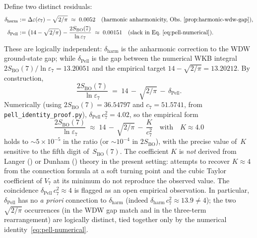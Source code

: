 \begin{observation}
\label{cor:pell-three-term}
Define two distinct residuals:
\begin{align*}
  \delta_{\mathrm{harm}} &:= \Delta\varepsilon(c_7) - \sqrt{2/\pi}
  \;\approx\; 0.0052 \quad\text{(harmonic anharmonicity,
    Obs.~\ref{prop:harmonic-wdw-gap})},\\
  \delta_{\mathrm{Pell}} &:= \bigl(14 - \sqrt{2/\pi}\bigr)
    - \frac{2S_{\mathrm{BO}}(7)}{\ln\varepsilon_7}
  \;\approx\; 0.00151 \quad\text{(slack in Eq.~\eqref{eq:pell-numerical})}.
\end{align*}
These are logically independent: $\delta_{\mathrm{harm}}$ is the
anharmonic correction to the WDW ground-state gap; while
$\delta_{\mathrm{Pell}}$ is the gap between the numerical WKB
integral $2S_{\mathrm{BO}}(7)/\ln\varepsilon_7 = 13.20051$ and the
empirical target $14 - \sqrt{2/\pi} = 13.20212$.
By construction,
\begin{equation}\label{eq:pell-three-term}
  \frac{2S_{\mathrm{BO}}(7)}{\ln\varepsilon_7}
  \;=\; 14 \,-\, \sqrt{2/\pi} \,-\, \delta_{\mathrm{Pell}}.
\end{equation}
Numerically (using $2S_{\mathrm{BO}}(7) = 36.54797$ and
$c_7 = 51.5741$, from \texttt{pell\_identity\_proof.py}),
$\delta_{\mathrm{Pell}}\,c_7^2 = 4.02$, so the empirical form
\begin{equation}\label{eq:pell-empirical}
  \frac{2S_{\mathrm{BO}}(7)}{\ln\varepsilon_7}
  \;\approx\; 14 \,-\, \sqrt{2/\pi} \,-\, \frac{K}{c_7^2}
  \quad\text{with}\quad K \approx 4.0
\end{equation}
holds to $\sim 5 \times 10^{-5}$ in the ratio (or $\sim 10^{-4}$
in $2S_{\mathrm{BO}}$), with the precise value of~$K$ sensitive
to the fifth digit of~$S_{\mathrm{BO}}(7)$.
The coefficient $K$ is \emph{not} derived from Langer
(\citealt{Langer1937}) or Dunham (\citealt{Dunham1932})
theory in the present setting: attempts to recover
$K \approx 4$ from the connection formula at a soft turning
point and the cubic Taylor coefficient of $V_7$ at its minimum
do not reproduce the observed value.
The coincidence $\delta_{\mathrm{Pell}}\,c_7^2 \approx 4$ is
flagged as an open empirical observation.
In particular, $\delta_{\mathrm{Pell}}$ has no \emph{a priori}
connection to $\delta_{\mathrm{harm}}$
(indeed $\delta_{\mathrm{harm}}\,c_7^2 \approx 13.9 \ne 4$);
the two $\sqrt{2/\pi}$ occurrences (in the WDW gap match and
in the three-term rearrangement) are logically distinct, tied
together only by the numerical identity~\eqref{eq:pell-numerical}.
\end{observation}

